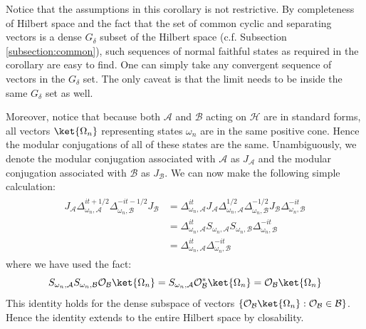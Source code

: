 \documentclass[a4paper,11pt]{article}
\theoremstyle{definition}
\begin{document}
Notice that the assumptions in this corollary is not restrictive. By completeness of Hilbert space and the fact that the set of common cyclic and separating vectors is a dense $G_\delta$ subset of the Hilbert space (c.f. Subsection \ref{subsection:common}), such sequences of normal faithful states as required in the corollary are easy to find. One can simply take any convergent sequence of vectors in the $G_\delta$ set. The only caveat is that the limit needs to be inside the same $G_\delta$ set as well. 

Moreover, notice that because both $\mathcal{A}$ and $\mathcal{B}$ acting on $\mathcal{H}$ are in standard forms, all vectors $\ket{\Omega_n}$ representing states $\omega_n$ are in the same positive cone. Hence the modular conjugations of all of these states are the same. Unambiguously, we denote the modular conjugation associated with $\mathcal{A}$ as $J_\mathcal{A}$ and the modular conjugation associated with $\mathcal{B}$ as $J_\mathcal{B}$. We can now make the following simple calculation:
\begin{align}
    \begin{split}
        J_\mathcal{A}\Delta_{\omega_n,\mathcal{A}}^{it + 1/2}\Delta_{\omega_n,\mathcal{B}}^{-it - 1/2}J_\mathcal{B} &= \Delta_{\omega_n, \mathcal{A}}^{it}J_\mathcal{A}\Delta_{\omega_n, \mathcal{A}}^{1/2}\Delta_{\omega_n,\mathcal{B}}^{-1/2}J_\mathcal{B}\Delta_{\omega_n,\mathcal{B}}^{-it}
        \\&=\Delta_{\omega_n, \mathcal{A}}^{it}S_{\omega_n,\mathcal{A}}S_{\omega_n,\mathcal{B}}\Delta_{\omega_n,\mathcal{B}}^{-it}
        \\& = \Delta_{\omega_n,\mathcal{A}}^{it}\Delta_{\omega_n,\mathcal{B}}^{-it}
    \end{split}
\end{align}
where we have used the fact:
\begin{equation}
    S_{\omega_n,\mathcal{A}}S_{\omega_n,\mathcal{B}}\mathcal{O}_\mathcal{B}\ket{\Omega_n} = S_{\omega_n,\mathcal{A}}\mathcal{O}^*_\mathcal{B}\ket{\Omega_n} = \mathcal{O}_\mathcal{B}\ket{\Omega_n}
\end{equation}
This identity holds for the dense subspace of vectors $\{\mathcal{O}_\mathcal{B}\ket{\Omega_n}:\mathcal{O}_\mathcal{B}\in\mathcal{B}\}$. Hence the identity extends to the entire Hilbert space by closability.
\end{document}
